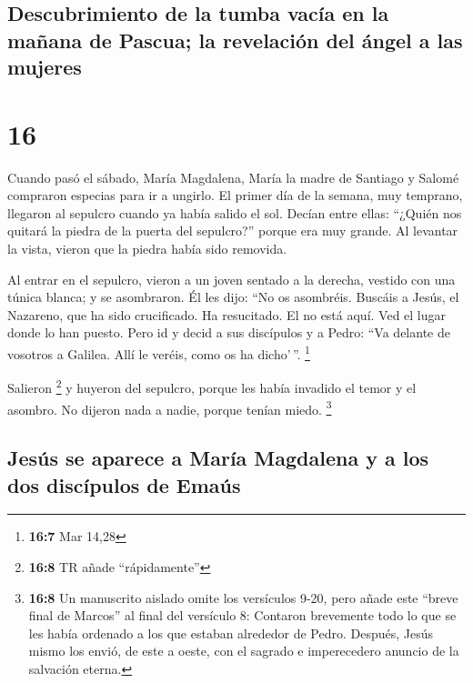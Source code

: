 \begin{paracol}{2}
{\subsection{Descubrimiento de la tumba vacía en la mañana de Pascua; la
revelación del ángel a las
mujeres}\label{descubrimiento-de-la-tumba-vacuxeda-en-la-mauxf1ana-de-pascua-la-revelaciuxf3n-del-uxe1ngel-a-las-mujeres}}

\hypertarget{section-29}{%
\section{16}\label{section-29}}

 Cuando pasó el sábado, María Magdalena, María la madre de
Santiago y Salomé compraron especias para ir a ungirlo. 
El primer día de la semana, muy temprano, llegaron al sepulcro cuando ya
había salido el sol.  Decían entre ellas: ``¿Quién nos
quitará la piedra de la puerta del sepulcro?''  porque era
muy grande. Al levantar la vista, vieron que la piedra había sido
removida.

 Al entrar en el sepulcro, vieron a un joven sentado a la
derecha, vestido con una túnica blanca; y se asombraron. 
Él les dijo: ``No os asombréis. Buscáis a Jesús, el Nazareno, que ha
sido crucificado. Ha resucitado. El no está aquí. Ved el lugar donde lo
han puesto.  Pero id y decid a sus discípulos y a Pedro:
``Va delante de vosotros a Galilea. Allí le veréis, como os ha
dicho'\,''. \footnote{\textbf{16:7} Mar 14,28}

 Salieron \footnote{\textbf{16:8} TR añade ``rápidamente''}
y huyeron del sepulcro, porque les había invadido el temor y el asombro.
No dijeron nada a nadie, porque tenían miedo. \footnote{\textbf{16:8} Un
  manuscrito aislado omite los versículos 9-20, pero añade este ``breve
  final de Marcos'' al final del versículo 8: Contaron brevemente todo
  lo que se les había ordenado a los que estaban alrededor de Pedro.
  Después, Jesús mismo los envió, de este a oeste, con el sagrado e
  imperecedero anuncio de la salvación eterna.}

\hypertarget{jesuxfas-se-aparece-a-maruxeda-magdalena-y-a-los-dos-discuxedpulos-de-emauxfas}{%
\subsection{Jesús se aparece a María Magdalena y a los dos discípulos de
Emaús}\label{jesuxfas-se-aparece-a-maruxeda-magdalena-y-a-los-dos-discuxedpulos-de-emauxfas}}


\end{paracol}
